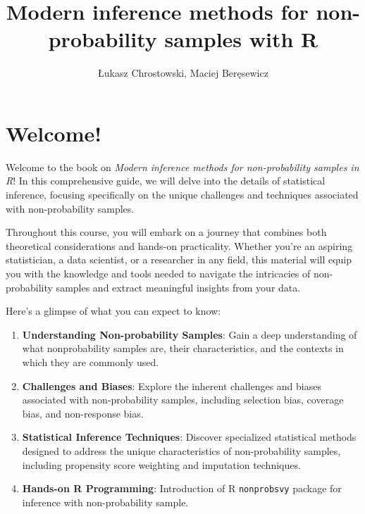 \documentclass[
  letterpaper,
  DIV=11,
  numbers=noendperiod]{scrreprt}
\title{Modern inference methods for non-probability samples with R}
\author{Łukasz Chrostowski, Maciej Beręsewicz}
\date{}
\renewcommand*\contentsname{Table of contents}
\newcommand\contentsname{Table of contents}
\begin{document}
\maketitle

\renewcommand*\contentsname{Table of contents}
{
\hypersetup{linkcolor=}
\setcounter{tocdepth}{2}
\tableofcontents
}


\chapter{Welcome!}\label{welcome}

Welcome to the book on \emph{Modern inference methods for
non-probability samples in R}! In this comprehensive guide, we will
delve into the details of statistical inference, focusing specifically
on the unique challenges and techniques associated with non-probability
samples.

Throughout this course, you will embark on a journey that combines both
theoretical considerations and hands-on practicality. Whether you're an
aspiring statistician, a data scientist, or a researcher in any field,
this material will equip you with the knowledge and tools needed to
navigate the intricacies of non-probability samples and extract
meaningful insights from your data.

Here's a glimpse of what you can expect to know:

\begin{enumerate}
\def\labelenumi{\arabic{enumi}.}
\item
  \textbf{Understanding Non-probability Samples}: Gain a deep
  understanding of what nonprobability samples are, their
  characteristics, and the contexts in which they are commonly used.
\item
  \textbf{Challenges and Biases}: Explore the inherent challenges and
  biases associated with non-probability samples, including selection
  bias, coverage bias, and non-response bias.
\item
  \textbf{Statistical Inference Techniques}: Discover specialized
  statistical methods designed to address the unique characteristics of
  non-probability samples, including propensity score weighting and
  imputation techniques.
\item
  \textbf{Hands-on R Programming}: Introduction of R \texttt{nonprobsvy}
  package for inference with non-probability sample.
\end{enumerate}
\end{document}
